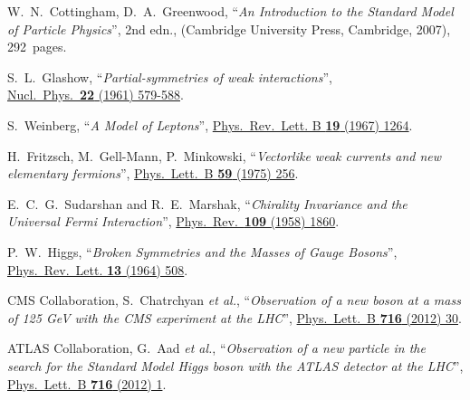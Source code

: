 \begin{thebibliography}{00}

W.~N.~Cottingham, D.~A.~Greenwood,
``\textit{An Introduction to the Standard Model of Particle Physics}'',
2nd edn., (Cambridge University Press, Cambridge, 2007), 292~pages.



S.~L.~Glashow,
``\textit{Partial-symmetries of weak interactions}'',\\
\href{http://dx.doi.org/10.1016/0029-5582(61)90469-2}{Nucl.\ Phys.\ {\bf 22} (1961) 579-588}.



S.~Weinberg,
``\textit{A Model of Leptons}'',
\href{http://dx.doi.org/10.1103/PhysRevLett.19.1264}{Phys.\ Rev.\ Lett. B {\bf 19} (1967) 1264}.



H.~Fritzsch, M.~Gell-Mann, P.~Minkowski,
``\textit{Vectorlike weak currents and new elementary fermions}'',
\href{http://dx.doi.org/10.1016/0370-2693(75)90040-4}{Phys.\ Lett.\ B {\bf 59} (1975) 256}.



E.~C.~G.~Sudarshan and R.~E.~Marshak,
``\textit{Chirality Invariance and the Universal Fermi Interaction}'',
\href{http://dx.doi.org/10.1103/PhysRev.109.1860.2}{Phys.\ Rev.\ {\bf 109} (1958) 1860}.


P.~W.~Higgs,
``\textit{Broken Symmetries and the Masses of Gauge Bosons}'',\\
\href{http://dx.doi.org/10.1103/PhysRevLett.13.508}{Phys.\ Rev.\ Lett. {\bf 13} (1964) 508}.



CMS Collaboration, S.~Chatrchyan {\it et al.},
``\textit{Observation of a new boson at a mass of 125 GeV with the CMS experiment at the LHC}'',
\href{http://dx.doi.org/10.1016/j.physletb.2012.08.021}{Phys.\ Lett.\ B {\bf 716} (2012) 30}.



ATLAS Collaboration, G.~Aad {\it et al.},
``\textit{Observation of a new particle in the search for the Standard Model Higgs boson with the ATLAS detector at the LHC}'',\\
\href{http://dx.doi.org/10.1016/j.physletb.2012.08.020}{Phys.\ Lett.\ B {\bf 716} (2012) 1}.




\end{thebibliography}
